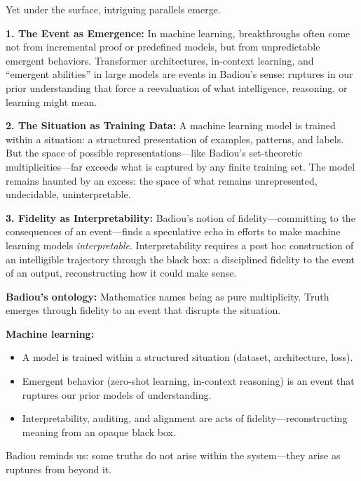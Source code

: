Yet under the surface, intriguing parallels emerge.

\textbf{1. The Event as Emergence:}  
In machine learning, breakthroughs often come not from incremental proof or predefined models, but from unpredictable emergent behaviors. Transformer architectures, in-context learning, and “emergent abilities” in large models are events in Badiou’s sense: ruptures in our prior understanding that force a reevaluation of what intelligence, reasoning, or learning might mean.

\textbf{2. The Situation as Training Data:}  
A machine learning model is trained within a situation: a structured presentation of examples, patterns, and labels. But the space of possible representations—like Badiou’s set-theoretic multiplicities—far exceeds what is captured by any finite training set. The model remains haunted by an excess: the space of what remains unrepresented, undecidable, uninterpretable.

\textbf{3. Fidelity as Interpretability:}  
Badiou’s notion of fidelity—committing to the consequences of an event—finds a speculative echo in efforts to make machine learning models \emph{interpretable}. Interpretability requires a post hoc construction of an intelligible trajectory through the black box: a disciplined fidelity to the event of an output, reconstructing how it could make sense.

\vspace{1em}

\begin{tcolorbox}[colback=gray!5!white, colframe=black, title=\textbf{Sidebar: Why Badiou Matters for ML (Even If He Doesn’t Know It)}, fonttitle=\bfseries, arc=1.5mm, boxrule=0.4pt]
\textbf{Badiou’s ontology:} Mathematics names being as pure multiplicity. Truth emerges through fidelity to an event that disrupts the situation.

\textbf{Machine learning:}
\begin{itemize}
  \item A model is trained within a structured situation (dataset, architecture, loss).
  \item Emergent behavior (zero-shot learning, in-context reasoning) is an event that ruptures our prior models of understanding.
  \item Interpretability, auditing, and alignment are acts of fidelity—reconstructing meaning from an opaque black box.
\end{itemize}

Badiou reminds us: some truths do not arise within the system—they arise as ruptures from beyond it.
\end{tcolorbox}

